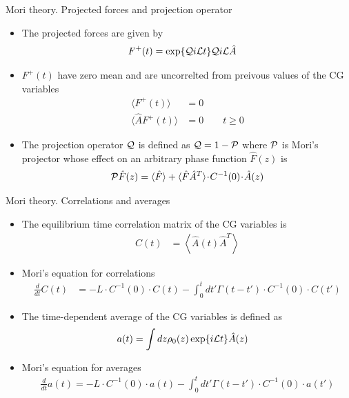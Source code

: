 \documentclass{beamer}
\newcommand{\esc}{\!\cdot\!}
\newcommand{\llangle}{\left\langle}
\newcommand{\rrangle}{\right\rangle}
\begin{document}
\begin{frame}{Mori theory. Projected forces and projection operator}
  \begin{itemize}
\item The projected forces are given by
\begin{align}
F^+(t)&= \exp\{{\cal Q}i{\cal L}t\} {\cal Q}i{\cal L}\hat{A}  
\nonumber
\end{align}
\item $F^+(t)$ have zero mean and are uncorrelted from preivous values of the CG variables
\begin{align}
\langle  F^+  (t)\rangle&=0  
\nonumber\\
\langle \hat{A} F^+ (t)\rangle&=0 \quad\quad t\ge 0
\nonumber
\end{align}
\item The projection operator ${\cal Q}$ is defined as ${\cal Q}=1-{\cal P}$
  where  ${\cal P}$  is \alert{Mori's  projector} whose  effect on  an arbitrary
phase function $\hat{F}(z)$ is
\begin{align}
  {\cal P}\hat{F}(z) = \langle \hat{F}\rangle+ \langle \hat{F}\hat{A}^T \rangle\esc  C^{-1}(0)\esc  \hat{A}(z)
\nonumber
\end{align}
\end{itemize}
\end{frame}
\begin{frame}{Mori theory. Correlations and averages}
  \begin{itemize}
    \item The equilibrium time  correlation matrix of the CG variables is 
\begin{align}
  C(t)&=  \llangle \hat{A}(t)\hat{A}^T\rrangle
\nonumber
\end{align}
\item \alert{Mori's equation for correlations}
\begin{align}
  \frac{d}{dt}C(t)&=-L\esc C^{-1}(0)\esc C(t)
-\int_0^tdt' \Gamma(t-t')\esc C^{-1}(0)\esc  C(t')
\nonumber
\end{align}

\item The time-dependent average of the CG variables is defined as
\begin{align}
  a(t)&=\int dz \rho_0(z) \exp\{i{\cal L}t\}\hat{A}(z)
  \nonumber
\end{align}
\item \alert{Mori's equation for averages}
\begin{align}
  \frac{d}{dt}a(t) = -L\esc C^{-1}(0)\esc a(t)
-\int_0^tdt' \Gamma(t-t')\esc  C^{-1}(0)\esc a(t')
\label{exactAve}
\nonumber
\end{align}
\end{itemize}
\end{frame}
\end{document}
